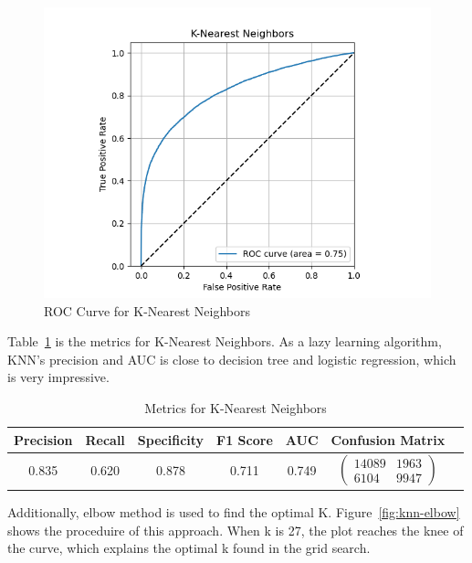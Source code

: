 \begin{figure}
    \centering
    \includegraphics[width=1\linewidth]{docs//assets/individual_roc_curve_K-Nearest Neighbors.png}
    \caption{ROC Curve for K-Nearest Neighbors}
    \label{fig:roc-knn}
\end{figure}

Table~\ref{tab:knn} is the metrics for K-Nearest Neighbors. As a lazy learning algorithm, KNN's precision and AUC is close to decision tree and logistic regression, which is very impressive.

\begin{table}
\centering
\begin{tabular}{|c|c|c|c|c|c|c}
\hline
\textbf{Precision} & \textbf{Recall} & \textbf{Specificity} & \textbf{F1 Score} & \textbf{AUC} & \textbf{Confusion Matrix} \\
\hline
0.835 & 0.620 & 0.878 & 0.711 & 0.749 & $\left(\begin{array}{cc} 14089 & 1963 \\ 6104 & 9947 \end{array}\right)$ \\ 
\hline
\end{tabular}
\caption{Metrics for K-Nearest Neighbors}
\label{tab:knn}
\end{table}

Additionally, elbow method is used to find the optimal K. Figure~\ref{fig:knn-elbow} shows the proceduire of this approach. When k is 27, the plot reaches the knee of the curve, which explains the optimal k found in the grid search.

